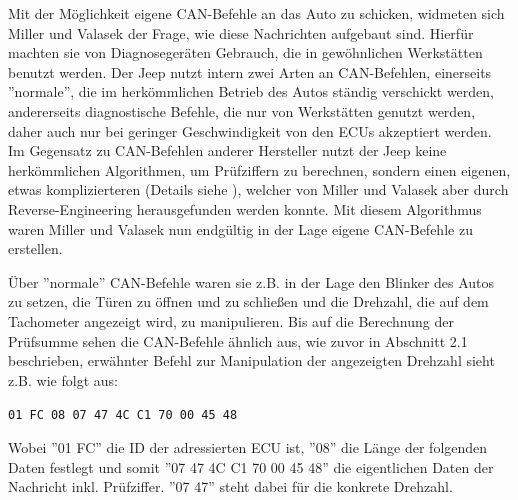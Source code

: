 \documentclass[
    fontsize=12pt,
    headings=small,
    parskip=half,           %
    bibliography=totoc,9
    numbers=noenddot,       %
    open=any,               %
    ]{scrreprt}
\begin{document}
Mit der Möglichkeit eigene CAN-Befehle an das Auto zu schicken, widmeten sich Miller und Valasek der Frage, wie diese Nachrichten aufgebaut sind. Hierfür machten sie von Diagnosegeräten Gebrauch, die in gewöhnlichen Werkstätten benutzt werden. Der Jeep nutzt intern zwei Arten an CAN-Befehlen, einerseits ''normale'', die im herkömmlichen Betrieb des Autos ständig verschickt werden, andererseits diagnostische Befehle, die nur von Werkstätten genutzt werden, daher auch nur bei geringer Geschwindigkeit von den ECUs akzeptiert werden. Im Gegensatz zu CAN-Befehlen anderer Hersteller nutzt der Jeep keine herkömmlichen Algorithmen, um Prüfziffern zu berechnen, sondern einen eigenen, etwas komplizierteren (Details siehe \cite{MiV15}), welcher von Miller und Valasek aber durch Reverse-Engineering herausgefunden werden konnte. Mit diesem Algorithmus waren Miller und Valasek nun endgültig in der Lage eigene CAN-Befehle zu erstellen. \par
Über ''normale'' CAN-Befehle waren sie z.B. in der Lage den Blinker des Autos zu setzen, die Türen zu öffnen und zu schließen und die Drehzahl, die auf dem Tachometer angezeigt wird, zu manipulieren. Bis auf die Berechnung der Prüfsumme sehen die CAN-Befehle ähnlich aus, wie zuvor in Abschnitt 2.1 beschrieben, erwähnter Befehl zur Manipulation der angezeigten Drehzahl sieht z.B. wie folgt aus:
\centerline{\texttt{01 FC 08 07 47 4C C1 70 00 45 48}}
Wobei ''01 FC'' die ID der adressierten ECU ist, ''08'' die Länge der folgenden Daten festlegt und somit ''07 47 4C C1 70 00 45 48'' die eigentlichen Daten der Nachricht inkl. Prüfziffer. ''07 47'' steht dabei für die konkrete Drehzahl.
\end{document}
